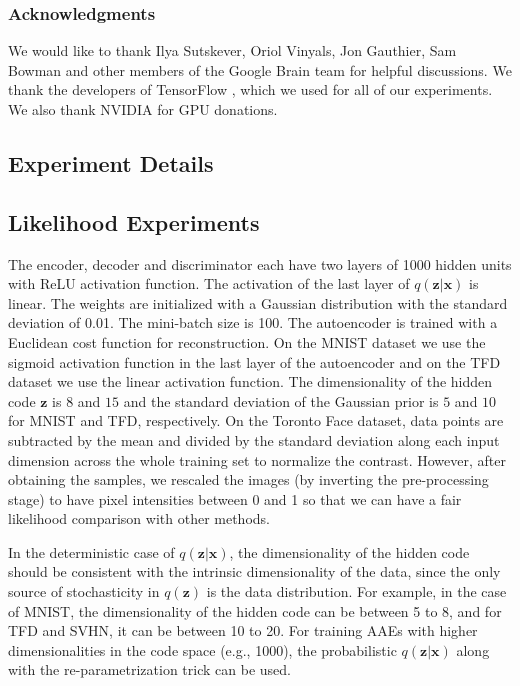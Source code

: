 \documentclass{article}
\begin{document}
\subsubsection*{Acknowledgments}
We would like to thank Ilya Sutskever, Oriol Vinyals, Jon Gauthier, Sam Bowman and other members of the Google Brain team for helpful discussions. We thank the developers of TensorFlow \citep{tensorflow2015-whitepaper}, which we used for all of our experiments. We also thank NVIDIA for GPU donations. 





\begin{appendices}


\section{Experiment Details}\label{exp:details}

\subsection{Likelihood Experiments}
The encoder, decoder and discriminator each have two layers of 1000 hidden units with ReLU activation function. The activation of the last layer of $q(\mathbf{z}|\mathbf{x})$ is linear. 
The weights are initialized with a Gaussian distribution with the standard deviation of 0.01. 
The mini-batch size is 100.
The autoencoder is trained with a Euclidean cost function for reconstruction.
On the MNIST dataset we use the sigmoid activation function in the last layer of the autoencoder and on the TFD dataset we use the linear activation function.
The dimensionality of the hidden code $\mathbf{z}$ is $8$ and $15$ and the standard deviation of the Gaussian prior is $5$ and $10$ for MNIST and TFD, respectively. On the Toronto Face dataset, data points are subtracted by the mean and divided by the standard deviation along each input dimension across the whole training set to normalize the contrast. However, after obtaining the samples, we rescaled the images (by inverting the pre-processing stage) to have pixel intensities between 0 and 1 so that we can have a fair likelihood comparison with other methods.

In the deterministic case of $q(\mathbf{z}|\mathbf{x})$, the dimensionality of the hidden code should be consistent with the intrinsic dimensionality of the data, since the only source of stochasticity in $q(\mathbf{z})$ is the data distribution. For example, in the case of MNIST, the dimensionality of the hidden code can be between 5 to 8, and for TFD and SVHN, it can be between 10 to 20. For training AAEs with higher dimensionalities in the code space (e.g., 1000), the probabilistic $q(\mathbf{z}|\mathbf{x})$ along with the re-parametrization trick can be used.


\end{appendices}
\end{document}
